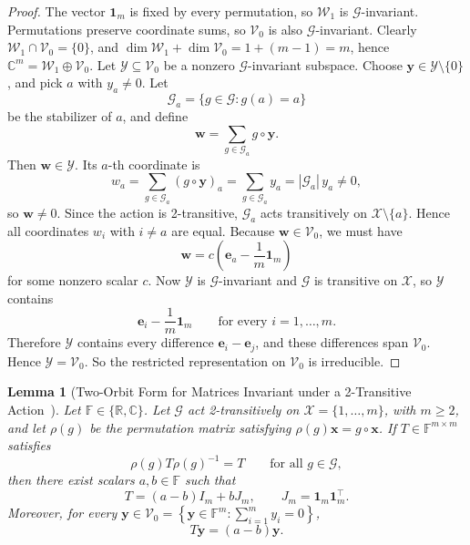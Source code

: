 \documentclass[11pt]{article}
\newtheorem{lemma}{Lemma}
\begin{document}
\begin{proof}
The vector \(\boldsymbol{1}_m\) is fixed by every permutation, so \(\mathcal W_1\) is
\(\mathcal G\)-invariant. Permutations preserve coordinate sums, so \(\mathcal V_0\) is also
\(\mathcal G\)-invariant. Clearly \(\mathcal W_1\cap \mathcal V_0=\{0\}\), and
\(\dim \mathcal W_1+\dim \mathcal V_0=1+(m-1)=m\), hence
\(\mathbb C^m=\mathcal W_1\oplus \mathcal V_0\).
Let \(\mathcal Y\subseteq \mathcal V_0\) be a nonzero \(\mathcal G\)-invariant subspace. Choose
\(\boldsymbol{y}\in \mathcal Y\setminus\{0\}\), and pick \(a\) with \(y_a\neq 0\). Let
\[
\mathcal G_a=\{g\in \mathcal G:g(a)=a\}
\]
be the stabilizer of \(a\), and define
\[
\boldsymbol w=\sum_{g\in \mathcal G_a}g\circ\boldsymbol{y}.
\]
Then \(\boldsymbol w\in \mathcal Y\). Its \(a\)-th coordinate is
\[
w_a=\sum_{g\in \mathcal G_a}(g\circ\boldsymbol{y})_a
=\sum_{g\in \mathcal G_a} y_a
=|\mathcal G_a|\,y_a\neq 0,
\]
so \(\boldsymbol w\neq 0\). Since the action is 2-transitive, \(\mathcal G_a\) acts
transitively on \(\mathcal X\setminus\{a\}\). Hence all coordinates \(w_i\) with
\(i\neq a\) are equal. Because \(\boldsymbol w\in \mathcal V_0\), we must have
\[
\boldsymbol w=c\left(\boldsymbol e_a-\frac1m\boldsymbol{1}_m\right)
\]
for some nonzero scalar \(c\).
Now \(\mathcal Y\) is \(\mathcal G\)-invariant and \(\mathcal G\) is transitive on \(\mathcal X\), so \(\mathcal Y\)
contains
\[
\boldsymbol e_i-\frac1m\boldsymbol{1}_m
\qquad\text{for every } i=1,\ldots,m.
\]
Therefore \(\mathcal Y\) contains every difference \(\boldsymbol e_i-\boldsymbol e_j\), and these differences
span \(\mathcal V_0\). Hence \(\mathcal Y=\mathcal V_0\). So the restricted representation on \(\mathcal V_0\) is
irreducible.
\end{proof}

\begin{lemma}[Two-Orbit Form for Matrices Invariant under a 2-Transitive Action~\citep{serre1977linear}]
\label{lem:two_orbit_matrix_form}
Let \(\mathbb F\in\{\mathbb R,\mathbb C\}\). Let \(\mathcal G\) act 2-transitively on
\(\mathcal X=\{1,\ldots,m\}\), with \(m\ge 2\), and let \(\rho(g)\) be the permutation matrix satisfying \(\rho(g)\boldsymbol{x}=g\circ\boldsymbol{x}\). If \(T\in\mathbb F^{m\times m}\) satisfies
\[
\rho(g)T\rho(g)^{-1}=T
\qquad\text{for all } g\in \mathcal G,
\]
then there exist scalars \(a,b\in\mathbb F\) such that
\[
T=(a-b)I_m+bJ_m,
\qquad J_m=\boldsymbol{1}_m\boldsymbol{1}_m^{\top}.
\]
Moreover, for every \(\boldsymbol{y}\in \mathcal V_0 =\left\{\boldsymbol{y}\in\mathbb F^m:\sum_{i=1}^m y_i=0\right\}\),
\[
T\boldsymbol{y}=(a-b)\boldsymbol{y}.
\]
\end{lemma}
\end{document}
